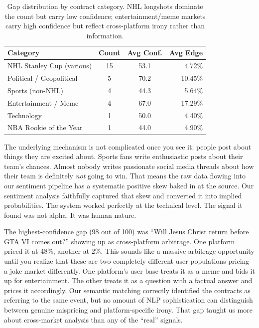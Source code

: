 \documentclass[conference]{IEEEtran}
\begin{document}
\begin{table}[H]
\centering
\caption{Gap distribution by contract category. NHL longshots dominate the count but carry low confidence; entertainment/meme markets carry high confidence but reflect cross-platform irony rather than information.}
\label{tab:gap_category}
\begin{tabular}{@{}lccr@{}}
\toprule
\textbf{Category} & \textbf{Count} & \textbf{Avg Conf.} & \textbf{Avg Edge} \\
\midrule
NHL Stanley Cup (various) & 15 & 53.1 & 4.72\% \\
Political / Geopolitical & 5 & 70.2 & 10.45\% \\
Sports (non-NHL) & 4 & 44.3 & 5.64\% \\
Entertainment / Meme & 4 & 67.0 & 17.29\% \\
Technology & 1 & 50.0 & 4.40\% \\
NBA Rookie of the Year & 1 & 44.0 & 4.90\% \\
\bottomrule
\end{tabular}
\end{table}

The underlying mechanism is not complicated once you see it: people post about things they are excited about. Sports fans write enthusiastic posts about their team's chances. Almost nobody writes passionate social media threads about how their team is definitely \emph{not} going to win. That means the raw data flowing into our sentiment pipeline has a systematic positive skew baked in at the source. Our sentiment analysis faithfully captured that skew and converted it into implied probabilities. The system worked perfectly at the technical level. The signal it found was not alpha. It was human nature.

The highest-confidence gap (98 out of 100) was ``Will Jesus Christ return before GTA VI comes out?'' showing up as cross-platform arbitrage. One platform priced it at 48\%, another at 2\%. This sounds like a massive arbitrage opportunity until you realize that these are two completely different user populations pricing a joke market differently. One platform's user base treats it as a meme and bids it up for entertainment. The other treats it as a question with a factual answer and prices it accordingly. Our semantic matching correctly identified the contracts as referring to the same event, but no amount of NLP sophistication can distinguish between genuine mispricing and platform-specific irony. That gap taught us more about cross-market analysis than any of the ``real'' signals.
\end{document}
